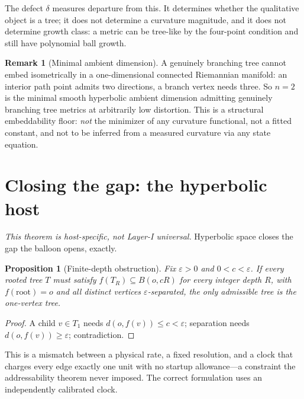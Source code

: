 \documentclass[11pt,reqno]{amsart}
\theoremstyle{plain}
\newtheorem{proposition}[theorem]{Proposition}
\theoremstyle{definition}
\newtheorem{remark}[theorem]{Remark}
\newcommand{\eps}{\varepsilon}
\begin{document}
The defect $\delta$ measures departure from this. It determines whether the qualitative object is a tree; it does not determine a curvature magnitude, and it does not determine growth class: a metric can be tree-like by the four-point condition and still have polynomial ball growth.

\begin{remark}[Minimal ambient dimension]\label{rem:floor}
A genuinely branching tree cannot embed isometrically in a one-dimensional connected Riemannian manifold: an interior path point admits two directions, a branch vertex needs three. So $n=2$ is the minimal smooth hyperbolic ambient dimension admitting genuinely branching tree metrics at arbitrarily low distortion. This is a structural embeddability floor: \emph{not} the minimizer of any curvature functional, not a fitted constant, and not to be inferred from a measured curvature via any state equation.
\end{remark}

\section{Closing the gap: the hyperbolic host}\label{sec:relational}

\emph{This theorem is host-specific, not Layer-I universal.} Hyperbolic space closes the gap the balloon opens, exactly.

\begin{proposition}[Finite-depth obstruction]\label{prop:finitedepth}
Fix $\eps>0$ and $0<c<\eps$. If every rooted tree $T$ must satisfy $f(T_R)\subseteq B(o,cR)$ for every integer depth $R$, with $f(\mathrm{root})=o$ and all distinct vertices $\eps$-separated, the only admissible tree is the one-vertex tree.
\end{proposition}

\begin{proof}
A child $v\in T_1$ needs $d(o,f(v))\le c<\eps$; separation needs $d(o,f(v))\ge\eps$; contradiction.
\end{proof}

This is a mismatch between a physical rate, a fixed resolution, and a clock that charges every edge exactly one unit with no startup allowance---a constraint the addressability theorem never imposed. The correct formulation uses an independently calibrated clock.
\end{document}

